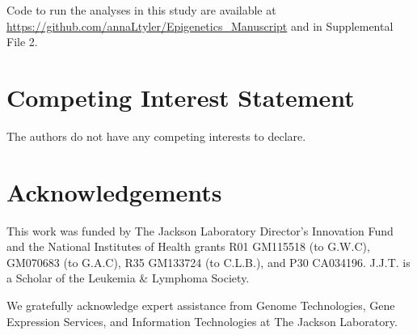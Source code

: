 \documentclass[
  11pt,
]{article}
\begin{document}
Code to run the analyses in this study are available at
\url{https://github.com/annaLtyler/Epigenetics_Manuscript} and in
Supplemental File 2.

\hypertarget{competing-interest-statement}{%
\section{Competing Interest
Statement}\label{competing-interest-statement}}

The authors do not have any competing interests to declare.

\hypertarget{acknowledgements}{%
\section{Acknowledgements}\label{acknowledgements}}

This work was funded by The Jackson Laboratory Director's Innovation
Fund and the National Institutes of Health grants R01 GM115518 (to
G.W.C), GM070683 (to G.A.C), R35 GM133724 (to C.L.B.), and P30 CA034196.
J.J.T. is a Scholar of the Leukemia \& Lymphoma Society.

We gratefully acknowledge expert assistance from Genome Technologies,
Gene Expression Services, and Information Technologies at The Jackson
Laboratory.

\pagebreak


\end{document}
